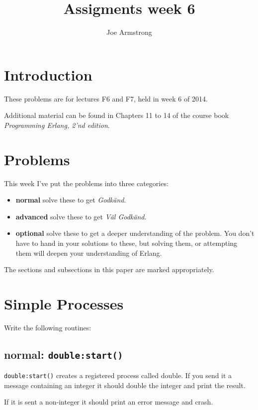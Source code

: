 \documentclass[12pt]{hitec}
\title{Assigments week 6}
\author{Joe Armstrong}
\begin{document}
\maketitle

\tableofcontents

\section{Introduction}
These problems are for lectures F6 and F7, held in week 6 of 2014.

Additional material can be found in Chapters 11 to 14 of the course book
{\sl Programming Erlang, 2'nd edition}.

\section{Problems}

This week I've put the problems into three categories:

\begin{itemize}
\item {\bf normal} solve these to get {\sl Godk\"{a}nd}.
\item {\bf advanced} solve these to get {\sl V\"{a}l Godk\"{a}nd}.
\item {\bf optional} solve these to get a deeper understanding of the problem. You don't
have to hand in your solutions to these, but solving them, or attempting them will
deepen your understanding of Erlang.
\end{itemize}

The sections and subsections in this paper are marked appropriately.

\section{Simple Processes}


Write the following routines:

\subsection{normal: \texttt{double:start()}}

\verb+double:start()+ creates a registered process called double.
If you send it a message containing an integer it should
double the integer and print the result.

If it is sent a non-integer it should print an error message
and crash.
\end{document}
